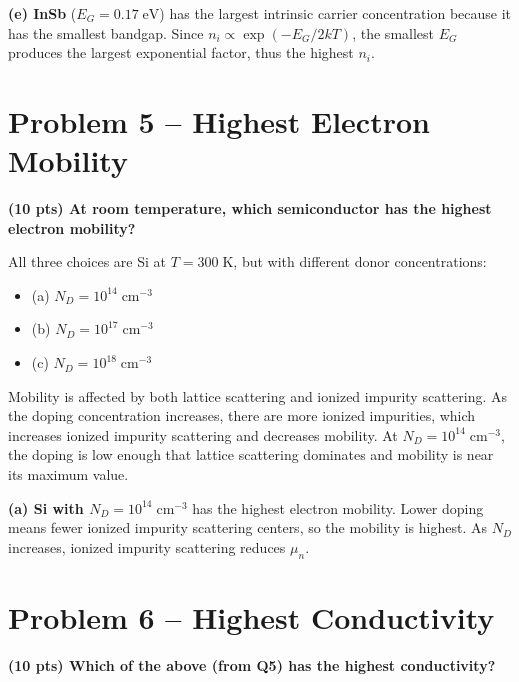 \documentclass[11pt]{article}
\begin{document}
\begin{answerbox}
  \textbf{(e) InSb} ($E_G = 0.17\;\text{eV}$) has the largest intrinsic carrier concentration because it has the smallest bandgap. Since $n_i \propto \exp(-E_G / 2kT)$, the smallest $E_G$ produces the largest exponential factor, thus the highest $n_i$.
\end{answerbox}

\newpage

\section*{Problem 5 -- Highest Electron Mobility}

\textbf{(10 pts) At room temperature, which semiconductor has the highest electron mobility?}

All three choices are Si at $T = 300\;\text{K}$, but with different donor concentrations:
\begin{itemize}[nosep]
  \item (a) $N_D = 10^{14}\;\text{cm}^{-3}$
  \item (b) $N_D = 10^{17}\;\text{cm}^{-3}$
  \item (c) $N_D = 10^{18}\;\text{cm}^{-3}$
\end{itemize}

Mobility is affected by both lattice scattering and ionized impurity scattering. As the doping concentration increases, there are more ionized impurities, which increases ionized impurity scattering and decreases mobility. At $N_D = 10^{14}\;\text{cm}^{-3}$, the doping is low enough that lattice scattering dominates and mobility is near its maximum value.

\begin{answerbox}
  \textbf{(a) Si with $N_D = 10^{14}\;\text{cm}^{-3}$} has the highest electron mobility. Lower doping means fewer ionized impurity scattering centers, so the mobility is highest. As $N_D$ increases, ionized impurity scattering reduces $\mu_n$.
\end{answerbox}

\newpage

\section*{Problem 6 -- Highest Conductivity}

\textbf{(10 pts) Which of the above (from Q5) has the highest conductivity?}
\end{document}
